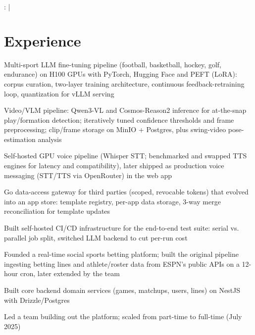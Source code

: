 \documentclass[]{jack-resume}
\begin{document}
\raggedright{
    :
      \href{https://www.linkedin.com/in/jack-sturtevant/}{ \ExternalLink} |
     \href{https://github.com/jacksturt}{ \ExternalLink}}


\section{Experience}

\begin{tightemize}
    \item Multi-sport LLM fine-tuning pipeline (football, basketball, hockey, golf, endurance) on H100 GPUs with PyTorch, Hugging Face and PEFT (LoRA): corpus curation, two-layer training architecture, continuous feedback-retraining loop, quantization for vLLM serving
    \item Video/VLM pipeline: Qwen3-VL and Cosmos-Reason2 inference for at-the-snap play/formation detection; iteratively tuned confidence thresholds and frame preprocessing; clip/frame storage on MinIO + Postgres, plus swing-video pose-estimation analysis
    \item Self-hosted GPU voice pipeline (Whisper STT; benchmarked and swapped TTS engines for latency and compatibility), later shipped as production voice messaging (STT/TTS via OpenRouter) in the web app
    \item Go data-access gateway for third parties (scoped, revocable tokens) that evolved into an app store: template registry, per-app data storage, 3-way merge reconciliation for template updates
    \item Built self-hosted CI/CD infrastructure for the end-to-end test suite: serial vs. parallel job split, switched LLM backend to cut per-run cost
\end{tightemize}
\sectionsep

\begin{tightemize}
    \item Founded a real-time social sports betting platform; built the original pipeline ingesting betting lines and athlete/roster data from ESPN's public APIs on a 12-hour cron, later extended by the team
    \item Built core backend domain services (games, matchups, users, lines) on NestJS with Drizzle/Postgres
    \item Led a team building out the platform; scaled from part-time to full-time (July 2025)
\end{tightemize}
\sectionsep
\end{document}
